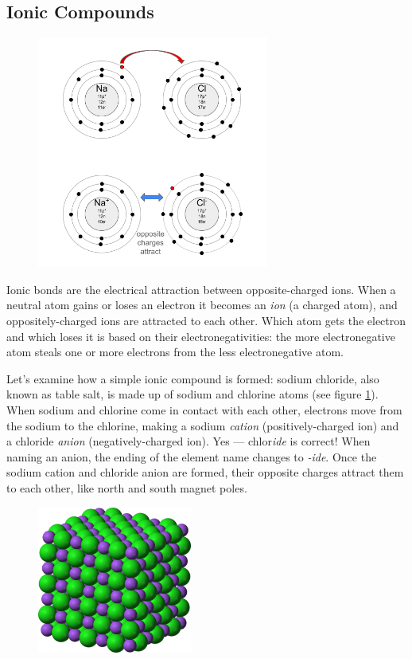 \subsection{Ionic Compounds}
\begin{figure}
\noindent\includegraphics[width=3in]{NaCl_xfer.png}
\caption{}
\label{fig:NaCl_xfer}
\end{figure}
Ionic bonds are the electrical attraction between opposite-charged ions. When a 
neutral atom gains or loses an electron it becomes an \textit{ion} (a charged 
atom), and oppositely-charged ions are attracted to each other. Which atom gets 
the electron and which loses it is based on their electronegativities: the more 
electronegative atom steals one or more electrons from the less electronegative 
atom.  

Let's examine how a simple ionic compound is formed: sodium chloride, also known 
as table salt, is made up of sodium and chlorine atoms (see figure 
\ref{fig:NaCl_xfer}). When sodium and chlorine come in contact with each other, 
electrons move from the sodium to the chlorine, making a sodium \textit{cation} 
(positively-charged ion) and a chloride \textit{anion} (negatively-charged ion). 
Yes --- chlor\textit{ide} is correct! When naming an anion, the ending of the 
element name changes to \textit{-ide}. Once the sodium cation and chloride anion 
are formed, their opposite charges attract them to each other, like north and 
south magnet poles. 

\begin{figure}
\noindent\includegraphics[width=2in]{NaCl_lattice.png}
\caption{}
\label{fig:NaCl_lattice}
\end{figure} %

